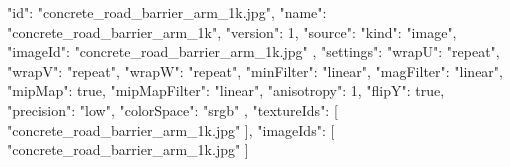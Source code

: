 {
  "id": "concrete_road_barrier_arm_1k.jpg",
  "name": "concrete_road_barrier_arm_1k",
  "version": 1,
  "source": {
    "kind": "image",
    "imageId": "concrete_road_barrier_arm_1k.jpg"
  },
  "settings": {
    "wrapU": "repeat",
    "wrapV": "repeat",
    "wrapW": "repeat",
    "minFilter": "linear",
    "magFilter": "linear",
    "mipMap": true,
    "mipMapFilter": "linear",
    "anisotropy": 1,
    "flipY": true,
    "precision": "low",
    "colorSpace": "srgb"
  },
  "textureIds": [
    "concrete_road_barrier_arm_1k.jpg"
  ],
  "imageIds": [
    "concrete_road_barrier_arm_1k.jpg"
  ]
}
